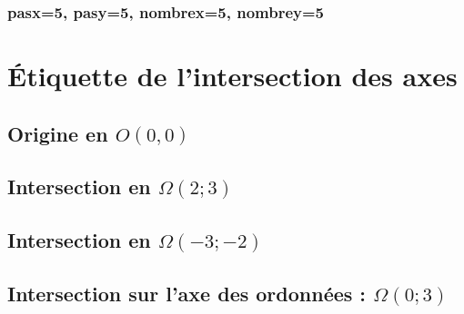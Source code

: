 \documentclass[11pt,a4paper]{article}
\begin{document}
\begin{center}
\reperegradue[bg={(-10,-10)}, hd={(10,10)}, pasx=2, pasy=2, grille=1]
\end{center}

\subsubsection{pasx=5, pasy=5, nombrex=5, nombrey=5}

\begin{center}
\reperegradue[bg={(-10,-10)}, hd={(10,10)},
              pasx=5, pasy=5, nombrex=5, nombrey=5, grille=1]
\end{center}

\section{Étiquette de l'intersection des axes}

\subsection{Origine en $O(0,0)$}

\begin{center}
\reperegradue[bg={(-5,-5)}, hd={(5,5)}]
\end{center}

\subsection{Intersection en $\Omega(2;3)$}

\begin{center}
\reperegradue[bg={(-5,-5)}, hd={(5,5)}, origine={(2,3)}]
\end{center}

\subsection{Intersection en $\Omega(-3;-2)$}

\begin{center}
\reperegradue[bg={(-5,-5)}, hd={(5,5)}, origine={(-3,-2)}]
\end{center}

\subsection{Intersection sur l'axe des ordonnées : $\Omega(0;3)$}
\end{document}
